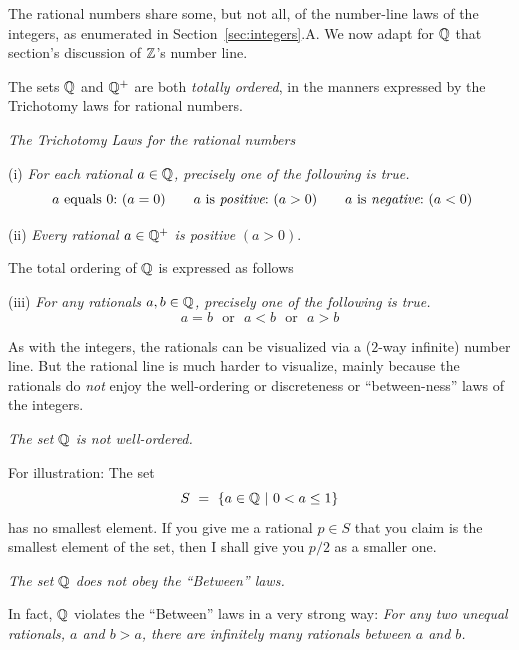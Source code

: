 The rational numbers share some, but not all, of the number-line laws of the integers, as enumerated in Section~\ref{sec:integers}.A.  We now adapt for $\mathbb{Q}$ that section's discussion of $\mathbb{Z}$'s number line.

\smallskip

The sets $\mathbb{Q}$ and $\mathbb{Q}^+$ are both {\em totally ordered}, in the manners expressed by the Trichotomy laws for rational numbers.

\medskip

\noindent
{\it The Trichotomy Laws for the rational numbers}
 

\noindent (i)
{\it For each rational $a \in \mathbb{Q}$, precisely one of the following is true.}
\[
\mbox{ $a$ equals $0$:} \ (a=0) \ \ \ \
\ \mbox{ $a$ is {\em positive}:} \ (a>0) \ \ \ \
 \ \mbox{ $a$ is {\em negative}:} \ (a<0)
\]

\noindent (ii)
{\it Every rational $a \in \mathbb{Q}^+$ is positive} $(a>0)$.

\medskip

\noindent
The total ordering of $\mathbb{Q}$ is expressed as follows 

\noindent (iii)
{\it For any rationals $a, b \in \mathbb{Q}$, precisely one of the following is true.}
\[  a=b \ \ \ \mbox{or} \ \ \  a<b \ \ \ \mbox{or} \ \ \ a>b \]

\smallskip

As with the integers, the rationals can be visualized via a ($2$-way infinite) number line.  But the rational line is much harder to visualize, mainly because the rationals do {\em not} enjoy the
well-ordering or discreteness or ``between-ness'' laws of the integers.

\medskip

\noindent
{\em The set $\mathbb{Q}$ is {\em not} well-ordered.}

\smallskip

For illustration:  The set
\[ S \ = \ \{ a \in \mathbb{Q}  \ |\ 0 < a \leq 1 \} \]
has no smallest element.  If you give me a rational $p \in S$ that you claim is the smallest element of the set, then I shall give you $p/2$ as a smaller one.

\medskip

\noindent
{\em The set $\mathbb{Q}$ does {\em not} obey the ``Between'' laws.}

\smallskip

In fact, $\mathbb{Q}$ violates the ``Between'' laws in a very strong way: {\it For any two unequal rationals, $a$ and $b>a$, there are infinitely many rationals between $a$ and $b$.}

